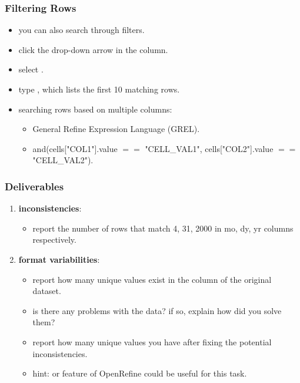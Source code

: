 \documentclass{beamer}					%
\begin{document}
\begin{frame}[c]
\frametitle{Filtering Rows}
\begin{itemize}
\item you can also search through filters.
\item click the drop-down arrow in the  column.
\item select \say{\textcolor{red}{Text Filter}}.
\item type , which lists the first 10 matching rows.
\item searching rows based on multiple columns:
\begin{itemize}
\item General Refine Expression Language (GREL).
\item and(cells["COL1"].value $==$ "CELL\_VAL1", cells["COL2"].value $==$ "CELL\_VAL2").
\end{itemize}
\end{itemize}
\end{frame}

 \begin{frame}[c]
 \frametitle{Deliverables}
 \begin{enumerate}
 \item \textbf{inconsistencies}: 
 \begin{itemize}
\item report the number of rows that match 4, 31, 2000 in mo, dy, yr columns respectively.
\end{itemize}
\item \textbf{format variabilities}:
\begin{itemize}
\item report how many unique values exist in the  column of the original dataset.
\item is there any problems with the data? if so, explain how did you solve them? 
\item report how many unique values you have after fixing the potential inconsistencies.
\item hint:  or  feature of OpenRefine could be useful for this task.
 \end{itemize}
\setcounter{enumTemp}{\theenumi}
 \end{enumerate}
\end{frame}
\end{document}
